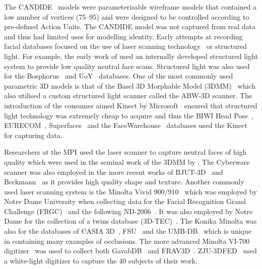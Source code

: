 The CANDIDE~\cite{Rydfalk:1987tg,Ahlberg:1998uk} models were parameterisable
wireframe models that contained a low number of vertices (75--95) and were
designed to be controlled according to pre-defined Action Units. The CANDIDE
model was not captured from real data and thus had limited uses for modelling
identity. Early attempts at recording facial databases focused on the use
of laser scanning technology~\cite{cyberware,minolta} or structured light. For
example, the early work of \citet{beumier2001face} used an internally developed
structured light system to provide low quality neutral face scans. Structured
light was also used for the Bosphorus~\cite{Savran:2008gg}
and UoY~\cite{heseltine2008three} databases. One of the most commonly used
parametric 3D models is that of the Basel 3D Morphable Model
(3DMM)~\cite{paysan20093d} which also utilised a custom structured light
scanner called the ABW-3D scanner. The introduction of the consumer aimed
Kinect by Microsoft~\cite{zhang2012microsoft} ensured that structured light
technology was extremely cheap to acquire and thus the BIWI Head
Pose~\cite{fanelli2013random}, EURECOM~\cite{min2014kinectfacedb},
Superfaces~\cite{berretti2012superfaces} and the
FaceWarehouse~\cite{Cao:2014gy} databases used the Kinect for capturing data.

Researchers at the MPI used the \citet{cyberware} laser scanner to capture
neutral faces of high quality which were used in the seminal work of the 3DMM
by \citet{volker1999morphable}. The Cyberware scanner was also employed in the more
recent works of BJUT-3D~\cite{baocai2009bjut} and Beckmann~\cite{hu2007building}
as it provides high quality shape and texture. Another commonly used
laser scanning system is the Minolta Vivid 900/910~\cite{minolta} which was
employed by Notre Dame University when collecting data for the Facial
Recognition Grand Challenge (FRGC)~\cite{phillips2005overview} and the following
ND-2006~\cite{faltemier2007using}. It was also employed by Notre Dame for the
collection of a twins database (3D-TEC)~\cite{vijayan2011twins}.
The Konika Minolta was also for the databases of CASIA 3D~\cite{casia3d},
FSU~\cite{hesher2003novel} and the UMB-DB~\cite{colombo2011umb} which is unique
in containing many examples of occlusions. The more advanced
Minolta VI-700 digitizer~\cite{minolta} was used to collect both
GavabDB~\cite{moreno2004gavabdb} and FRAV3D~\cite{conde2006multimodal}.
ZJU-3DFED~\cite{wang2006exploring} used a white-light digitizer to capture
the 40 subjects of their work.

